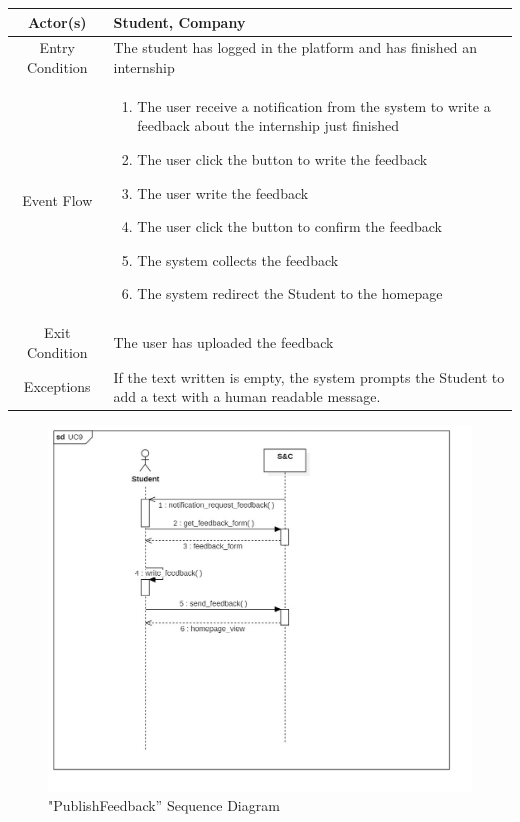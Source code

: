 \documentclass{article}
\begin{document}
\begin{table}[H]
    \centering
    \begin{tabular}{|c|p{10cm}|}
    \hline
        Actor(s)  & Student, Company\\ 
    \hline
        Entry Condition &  
        The student has logged in the platform and has finished an internship\\
    \hline
        Event Flow &
        \begin{enumerate}
            \item The user receive a notification from the system to write a feedback about the internship just finished
            \item The user click the button to write the feedback
            \item The user write the feedback
            \item The user click the button to confirm the feedback
            \item The system collects the feedback 
            \item The system redirect the Student to the homepage
        \end{enumerate}
        \\
    \hline
        Exit Condition & The user has uploaded the feedback\\
    \hline
        Exceptions &  If the text written is empty, the system prompts the Student to add a text with a human readable message.\\
    \hline
    \end{tabular}
    \label{tab:my_label}
\end{table}
\begin{figure}[H]
    \centering
    \includegraphics[width=1\linewidth]{sequenceDiagrams/UC9.jpg}
    \caption{"PublishFeedback” Sequence Diagram}
    \label{fig:enter-label}
\end{figure}
\end{document}
